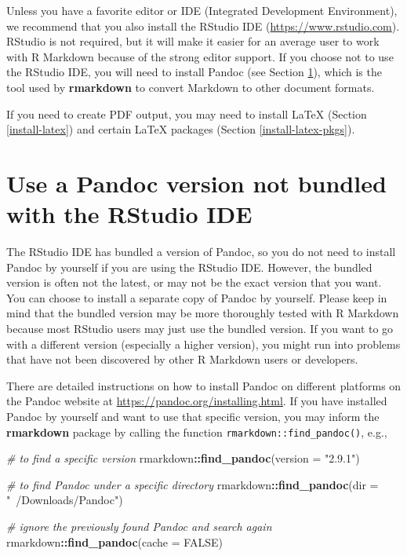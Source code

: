 \documentclass[
  11pt,
]{krantz}
\newenvironment{Shaded}{\begin{snugshade}}{\end{snugshade}}
\newcommand{\CommentTok}[1]{\textcolor[rgb]{0.37,0.37,0.37}{\textit{#1}}}
\newcommand{\DataTypeTok}[1]{\textcolor[rgb]{0.27,0.27,0.27}{#1}}
\newcommand{\KeywordTok}[1]{\textcolor[rgb]{0.27,0.27,0.27}{\textbf{#1}}}
\newcommand{\NormalTok}[1]{#1}
\newcommand{\OperatorTok}[1]{\textcolor[rgb]{0.43,0.43,0.43}{\textbf{#1}}}
\newcommand{\OtherTok}[1]{\textcolor[rgb]{0.37,0.37,0.37}{#1}}
\newcommand{\StringTok}[1]{\textcolor[rgb]{0.5,0.5,0.5}{#1}}
\begin{document}
Unless you have a favorite editor or IDE (Integrated Development Environment), we recommend that you also install the RStudio IDE (\url{https://www.rstudio.com}). RStudio is not required, but it will make it easier for an average user to work with R Markdown because of the strong editor support. If you choose not to use the RStudio IDE, you will need to install Pandoc (see Section \ref{install-pandoc}), which is the tool used by \textbf{rmarkdown} to convert Markdown to other document formats.

If you need to create PDF output, you may need to install LaTeX (Section \ref{install-latex}) and certain LaTeX packages (Section \ref{install-latex-pkgs}).

\hypertarget{install-pandoc}{%
\section{Use a Pandoc version not bundled with the RStudio IDE}\label{install-pandoc}}

The RStudio IDE has bundled a version of Pandoc, so you do not need to install Pandoc by yourself if you are using the RStudio IDE. However, the bundled version is often not the latest, or may not be the exact version that you want. You can choose to install a separate copy of Pandoc by yourself. Please keep in mind that the bundled version may be more thoroughly tested with R Markdown because most RStudio users may just use the bundled version. If you want to go with a different version (especially a higher version), you might run into problems that have not been discovered by other R Markdown users or developers.

There are detailed instructions on how to install Pandoc on different platforms on the Pandoc website at \url{https://pandoc.org/installing.html}. If you have installed Pandoc by yourself and want to use that specific version, you may inform the \textbf{rmarkdown} package by calling the function \texttt{rmarkdown::find\_pandoc()}, e.g.,

\begin{Shaded}
\begin{Highlighting}[]
\CommentTok{# to find a specific version}
\NormalTok{rmarkdown}\OperatorTok{::}\KeywordTok{find_pandoc}\NormalTok{(}\DataTypeTok{version =} \StringTok{"2.9.1"}\NormalTok{)}

\CommentTok{# to find Pandoc under a specific directory}
\NormalTok{rmarkdown}\OperatorTok{::}\KeywordTok{find_pandoc}\NormalTok{(}\DataTypeTok{dir =} \StringTok{"~/Downloads/Pandoc"}\NormalTok{)}

\CommentTok{# ignore the previously found Pandoc and search again}
\NormalTok{rmarkdown}\OperatorTok{::}\KeywordTok{find_pandoc}\NormalTok{(}\DataTypeTok{cache =} \OtherTok{FALSE}\NormalTok{)}
\end{Highlighting}
\end{Shaded}
\end{document}
